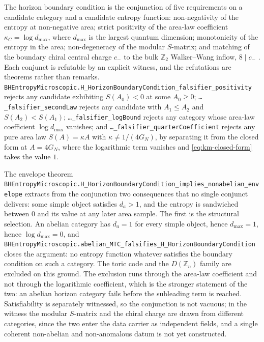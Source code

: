 \documentclass[aps,prd,nofootinbib,superscriptaddress,12pt]{revtex4-2}
\DeclareRobustCommand{\lb}{\discretionary{}{}{}}
\begin{document}
The horizon boundary condition is the conjunction of five requirements on a candidate
category and a candidate entropy function: non-negativity of the entropy at non-negative
area; strict positivity of the area-law coefficient $\kappa_C = \log d_{\max}$, where
$d_{\max}$ is the largest quantum dimension; monotonicity of the entropy in the area;
non-degeneracy of the modular $S$-matrix; and matching of the boundary chiral central
charge $c_-$ to the bulk $\mathbb{Z}_2$ Walker--Wang inflow, $8 \mid c_-$
\cite{WalkerWang2012}. Each conjunct is refutable by an explicit witness, and the
refutations are theorems rather than remarks.
\texttt{BHEntropy\lb{}Microscopic.\lb{}H\_\lb{}Horizon\lb{}Boundary\lb{}Condition\_\lb{}falsifier\_\lb{}positivity} rejects any
candidate exhibiting $S(A_0) < 0$ at some $A_0 \ge 0$;
\texttt{\dots\_\lb{}falsifier\_\lb{}second\lb{}Law} rejects any candidate with $A_1 \le A_2$ and
$S(A_2) < S(A_1)$; \texttt{\dots\_\lb{}falsifier\_\lb{}log\lb{}Bound} rejects any category whose area-law
coefficient $\log d_{\max}$ vanishes; and
\texttt{\dots\_\lb{}falsifier\_\lb{}quarter\lb{}Coefficient} rejects any pure area law $S(A) = \kappa A$
with $\kappa \neq 1/(4G_N)$, by separating it from the closed form at $A = 4G_N$, where the
logarithmic term vanishes and \eqref{eq:km-closed-form} takes the value $1$.

The envelope theorem
\texttt{BHEntropy\lb{}Microscopic.\lb{}H\_\lb{}Horizon\lb{}Boundary\lb{}Condition\_\lb{}implies\_\lb{}nonabelian\_\lb{}envelope}
extracts from the conjunction two consequences that no single conjunct delivers: some simple
object satisfies $d_a > 1$, and the entropy is sandwiched between $0$ and its value at any
later area sample. The first is the structural selection. An abelian category has
$d_a = 1$ for every simple object, hence $d_{\max} = 1$, hence $\log d_{\max} = 0$, and
\texttt{BHEntropy\lb{}Microscopic.\lb{}abelian\_\lb{}MTC\_\lb{}falsifies\_\lb{}H\_\lb{}Horizon\lb{}Boundary\lb{}Condition} closes the
argument: no entropy function whatever satisfies the boundary condition on such a category.
The toric code and the $D(\mathbb{Z}_n)$ family are excluded on this ground. The exclusion
runs through the area-law coefficient and not through the logarithmic coefficient, which is
the stronger statement of the two: an abelian horizon category fails before the subleading
term is reached. Satisfiability is separately witnessed, so the conjunction is not vacuous;
in the witness the modular $S$-matrix and the chiral charge are drawn from different
categories, since the two enter the data carrier as independent fields, and a single
coherent non-abelian and non-anomalous datum is not yet constructed.
\end{document}
